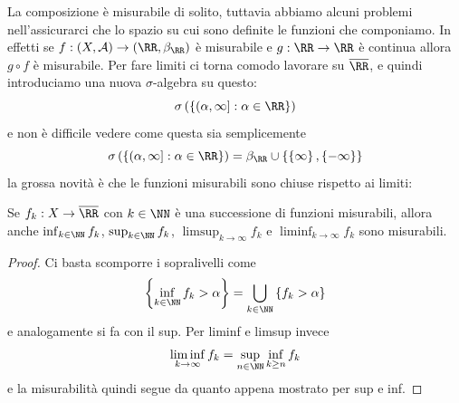 \documentclass[11pt]{scrartcl}
\begin{document}
	La composizione è misurabile di solito, tuttavia abbiamo alcuni problemi nell'assicurarci che lo spazio su cui sono definite le funzioni che componiamo. In effetti se $f:\left(X,\mathcal{A}\right)\to \left(\RR,\beta_{\RR}\right)$ è misurabile e $g:\RR\to\RR$ è continua allora $g\circ f$ è misurabile. 
	Per fare limiti ci torna comodo lavorare su $\overline{\RR}$, e quindi introduciamo una nuova $\sigma$-algebra su questo:
	$$\sigma\left(\left\{(\alpha,\infty]:\alpha\in \RR\right\}\right)$$
	e non è difficile vedere come questa sia semplicemente 
	$$\sigma\left(\left\{(\alpha,\infty]:\alpha\in \RR\right\}\right)=\beta_{\RR}\cup \left\{\left\{\infty\right\},\left\{-\infty\right\}\right\}$$
	la grossa novità è che le funzioni misurabili sono chiuse rispetto ai limiti:
	\begin{proposition}
		Se $f_k:X\to \overline{\RR}$ con $k\in\NN$ è una successione di funzioni misurabili, allora anche
		$\inf_{k\in\NN} f_k$, $\sup_{k\in\NN} f_k$, $\limsup_{k\to\infty} f_k$ e $\liminf_{k\to\infty} f_k$ sono misurabili.
	\end{proposition}
	\begin{proof}
		Ci basta scomporre i sopralivelli come
		$$\left\{\inf_{k\in\NN} f_k>\alpha\right\}=\bigcup_{k\in\NN}\left\{f_k>\alpha\right\}$$
		e analogamente si fa con il sup. Per liminf e limsup invece
		$$\liminf_{k\to\infty} f_k=\sup_{n\in\NN}\inf_{k\ge n}f_k$$
		e la misurabilità quindi segue da quanto appena mostrato per sup e inf.
	\end{proof}
\end{document}
